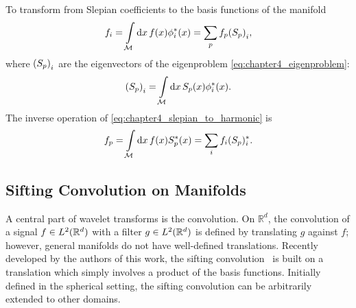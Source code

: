 To transform from Slepian coefficients to the basis functions of the manifold
%
\begin{equation}\label{eq:chapter4_slepian_to_harmonic}
	f_{i}
	= \int\limits_{\mathcal{M}} \dd{x} f(x) \phi_{i}^{\ast}(x)
	= \sum\limits_{p} {f}_{p} {({S}_{p})}_{i},
\end{equation}
%
where \({({S}_{p})}_{i}\) are the eigenvectors of the eigenproblem \cref{eq:chapter4_eigenproblem}:
%
\begin{equation}
	{({S}_{p})}_{i}
	= \int\limits_{\mathcal{M}} \dd{x} {S}_{p}(x) \phi_{i}^{\ast}(x).
\end{equation}
%
The inverse operation of \cref{eq:chapter4_slepian_to_harmonic} is
%
\begin{equation}\label{eq:chapter4_harmonic_to_slepian}
	{f}_{p}
	= \int\limits_{\mathcal{M}} \dd{x} f(x) {S}_{p}^{\ast}(x)
	= \sum\limits_{i} f_{i} ({S}_{p})^{\ast}_{i}.
\end{equation}

\subsection{Sifting Convolution on Manifolds}\label{sec:chapter4_sifting_convolution_manifolds}

A central part of wavelet transforms is the convolution.
On \(\mathbb{R}^{d}\), the convolution of a signal \(f \in L^{2}(\mathbb{R}^{d})\) with a filter \(g \in L^{2}(\mathbb{R}^{d})\) is defined by translating \(g\) against \(f\); however, general manifolds do not have well-defined translations.
Recently developed by the authors of this work, the sifting convolution~\cite{Roddy2021} is built on a translation which simply involves a product of the basis functions.
Initially defined in the spherical setting, the sifting convolution can be arbitrarily extended to other domains.

